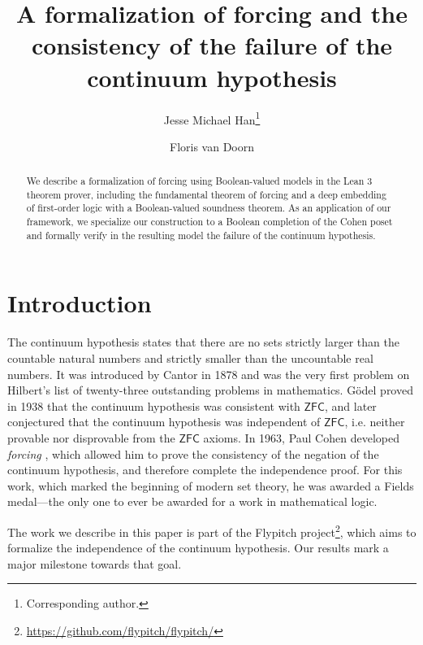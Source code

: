 \documentclass[a4paper,USenglish,cleveref, autoref]{lipics-v2019}
\title{A formalization of forcing and the consistency of the failure of the continuum hypothesis} %
\author{Jesse Michael Han\footnote{Corresponding author.}}{Department of Mathematics, University of Pittsburgh \and \url{https://www.pitt.edu/~jmh288}}{jessemichaelhan@gmail.com}{}{}%
\author{Floris van Doorn}{Department of Mathematics, University of Pittsburgh}{}{}{}
\theoremstyle{definition}
\begin{document}
\maketitle

\begin{abstract}
We describe a formalization of forcing using Boolean-valued models in the Lean 3 theorem prover, including the fundamental theorem of forcing and a deep embedding of first-order logic with a Boolean-valued soundness theorem. As an application of our framework, we specialize our construction to a Boolean completion of the Cohen poset and formally verify in the resulting model the failure of the continuum hypothesis.
\end{abstract}

\section*{Introduction}
The continuum hypothesis states that there are no sets strictly larger than the countable natural numbers and strictly smaller than the uncountable real numbers. It was introduced by Cantor in 1878 and was the very first problem on Hilbert's list of twenty-three outstanding problems in mathematics. G\"odel proved in 1938 \cite{godel1938consistency} that the continuum hypothesis was consistent with $\mathsf{ZFC}$, and later conjectured that the continuum hypothesis was independent of $\mathsf{ZFC}$, i.e. neither provable nor disprovable from the $\mathsf{ZFC}$ axioms. In 1963, Paul Cohen developed \emph{forcing} \cite{cohen-the-independence-of-the-continuum-hypothesis-1}, which allowed him to prove the consistency of the negation of the continuum hypothesis, and therefore complete the independence proof. For this work, which marked the beginning of modern set theory, he was awarded a Fields medal---the only one to ever be awarded for a work in mathematical logic.

The work we describe in this paper is part of the Flypitch project\footnote{\url{https://github.com/flypitch/flypitch/}}, which aims to formalize the independence of the continuum hypothesis. Our results mark a major milestone towards that goal.
\end{document}

